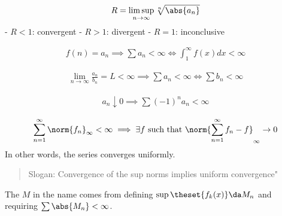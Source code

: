 \begin{theorem}

\begin{align*}
R = \limsup_{n \to \infty} \sqrt[n]{\abs{a_n}}
\end{align*} - \(R < 1\): convergent - \(R > 1\): divergent - \(R = 1\):
inconclusive

\end{theorem}

\begin{theorem}

\begin{align*}
f(n) = a_n \implies \sum a_n < \infty \iff \int_1^\infty f(x) dx < \infty
\end{align*}

\end{theorem}

\begin{theorem}

\begin{align*}
\lim_{n\to\infty}\frac{a_n}{b_n} = L < \infty \implies \sum a_n < \infty \iff \sum b_n < \infty
\end{align*}

\end{theorem}

\begin{theorem}

\begin{align*}
a_n \downarrow 0 \implies \sum (-1)^n a_n < \infty
\end{align*}

\end{theorem}

\begin{theorem}

\begin{align*}
\sum_{n=1}^\infty \norm{f_n}_\infty < \infty 
\implies \exists f\text{ such that } \norm{ \sum_{n=1}^\infty f_n - f}_\infty \to 0
\end{align*} In other words, the series converges uniformly.

\begin{quote}
Slogan: Convergence of the sup norms implies uniform convergence"
\end{quote}

\end{theorem}

\begin{remark}

The \(M\) in the name comes from defining
\(\sup\theset{f_k(x)} \da M_n\) and requiring
\(\sum \abs{M_n} < \infty\).

\end{remark}

